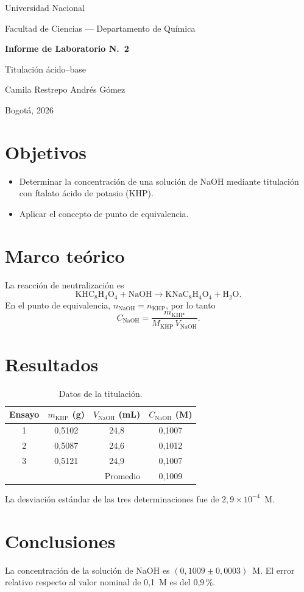 \documentclass[12pt,letterpaper]{article}
\begin{document}
\begin{titlepage}
\centering
{\Large Universidad Nacional\par}
\vspace{1cm}
{\large Facultad de Ciencias --- Departamento de Química\par}
\vspace{3cm}
{\huge\bfseries Informe de Laboratorio N.\textordmasculine\ 2\par}
\vspace{0.5cm}
{\Large Titulación ácido--base\par}
\vspace{3cm}
{\large Camila Restrepo \quad Andrés Gómez\par}
\vfill
{\large Bogotá, 2026\par}
\end{titlepage}

\section{Objetivos}
\begin{itemize}
  \item Determinar la concentración de una solución de NaOH mediante titulación con
        ftalato ácido de potasio (KHP).
  \item Aplicar el concepto de punto de equivalencia.
\end{itemize}

\section{Marco teórico}
La reacción de neutralización es
\[
\mathrm{KHC_8H_4O_4} + \mathrm{NaOH} \longrightarrow \mathrm{KNaC_8H_4O_4} + \mathrm{H_2O}.
\]
En el punto de equivalencia, $n_{\mathrm{NaOH}} = n_{\mathrm{KHP}}$, por lo tanto
\begin{equation}
C_{\mathrm{NaOH}} = \frac{m_{\mathrm{KHP}}}{M_{\mathrm{KHP}}\, V_{\mathrm{NaOH}}}.
\end{equation}

\section{Resultados}
\begin{table}[h]
\centering
\caption{Datos de la titulación.}
\begin{tabular}{cccc}
\toprule
Ensayo & $m_{\mathrm{KHP}}$ (g) & $V_{\mathrm{NaOH}}$ (mL) & $C_{\mathrm{NaOH}}$ (M) \\
\midrule
1 & 0,5102 & 24,8 & 0,1007 \\
2 & 0,5087 & 24,6 & 0,1012 \\
3 & 0,5121 & 24,9 & 0,1007 \\
\midrule
\multicolumn{3}{r}{Promedio} & 0,1009 \\
\bottomrule
\end{tabular}
\end{table}

La desviación estándar de las tres determinaciones fue de $2{,}9\times10^{-4}$~M.

\section{Conclusiones}
La concentración de la solución de NaOH es $(0{,}1009 \pm 0{,}0003)$~M. El error relativo
respecto al valor nominal de 0,1~M es del 0,9\,\%.
\end{document}
